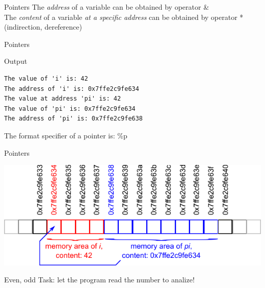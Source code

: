 \documentclass[usenames,dvipsnames,aspectratio=169]{beamer}
\newcommand{\kiemel}[1]{{\color{kiemelesszin}#1}}
\begin{document}
\begin{frame}{Pointers}
  The \emph{address} of a variable can be obtained by operator \kiemel{\&}\\
  The \emph{content} of a variable \emph{at a specific address} can be obtained by operator \kiemel{*} (indirection, dereference)\\
  \begin{exampleblock}{}
    \vspace{-.3cm}
    \footnotesize
    
    \vspace{-.3cm}
  \end{exampleblock}
\end{frame}

\begin{frame}[fragile]{Pointers}
  \begin{block}{Output}
    \begin{verbatim}
The value of 'i' is: 42
The address of 'i' is: 0x7ffe2c9fe634
The value at address 'pi' is: 42
The value of 'pi' is: 0x7ffe2c9fe634
The address of 'pi' is: 0x7ffe2c9fe638
\end{verbatim}
  \end{block}
  The format specifier of a pointer is: \kiemel{\%p}\\
  \begin{exampleblock}{}
    \footnotesize
    
  \end{exampleblock}
\end{frame}

\begin{frame}{Pointers}
  \begin{center}
    \includegraphics[scale=1.25]{pointer.pdf}
  \end{center}
\end{frame}

\begin{frame}{Even, odd}
  Task: let the program read the number to analize!
  \begin{exampleblock}{}
    \footnotesize
    
  \end{exampleblock}
\end{frame}
\end{document}
